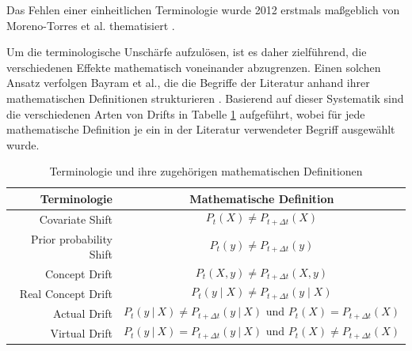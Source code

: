 Das Fehlen einer einheitlichen Terminologie wurde 2012 erstmals maßgeblich von Moreno-Torres et al. thematisiert \cite{moreno-torres.2012}. \par
Um die terminologische Unschärfe aufzulösen, ist es daher zielführend, die verschiedenen Effekte mathematisch voneinander abzugrenzen. Einen solchen Ansatz verfolgen Bayram et al., die die Begriffe der Literatur anhand ihrer mathematischen Definitionen strukturieren \cite{bayram.2022}. Basierend auf dieser Systematik sind die verschiedenen Arten von Drifts in Tabelle \ref{tab:cd_definitionen} aufgeführt, wobei für jede mathematische Definition je ein in der Literatur verwendeter Begriff ausgewählt wurde.
%
\begin{table}[tb!]
    \centering
    \renewcommand{\arraystretch}{1.2} %
    \caption{Terminologie und ihre zugehörigen mathematischen Definitionen}
    \begin{tabular}{rc}
        \toprule
        \textbf{Terminologie} & \textbf{Mathematische Definition} \\ 
        \midrule
        Covariate Shift & \parbox{10cm}{
            \begin{equation} \label{eq:covariate_shift} 
                P_t(X) \neq P_{t+\Delta t}(X)
            \end{equation}} \\
        Prior probability Shift & \parbox{10cm}{
            \begin{equation} \label{eq:prior_prob_shift}
                P_t(y) \neq P_{t+\Delta t}(y)
            \end{equation}} \\
        Concept Drift & \parbox{10cm}{
            \begin{equation} \label{eq:concept_drift}
                P_t(X, y) \neq P_{t+\Delta t}(X, y)
            \end{equation}} \\
        Real Concept Drift & \parbox{10cm}{
            \begin{equation} \label{eq:real_concept_drift}
                P_t(y \mid X) \neq P_{t+\Delta t}(y \mid X)
            \end{equation}} \\
        Actual Drift & \parbox{10cm}{
            \begin{equation} \label{eq:actual_drift}
                P_t(y \ | \ X) \neq P_{t+\Delta t}(y \ | \ X) \text{ und } P_t(X) = P_{t+\Delta t}(X) 
            \end{equation}} \\
        Virtual Drift & \parbox{10cm}{
            \begin{equation} \label{eq:virtual_drift}
                P_t(y \ | \ X) = P_{t+\Delta t}(y \ | \ X) \text{ und } P_t(X) \neq P_{t+\Delta t}(X) 
            \end{equation}} \\ 
        \bottomrule
\end{tabular}
\label{tab:cd_definitionen}
\vspace{3mm}
\end{table}
